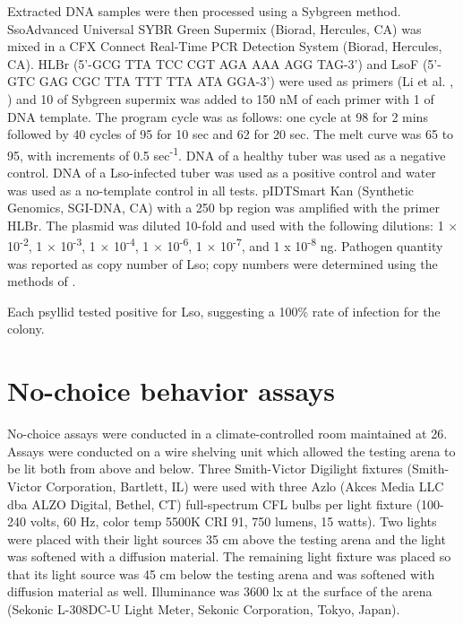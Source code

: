 \documentclass{UIdahoMastersThesis}
\begin{document}
Extracted DNA samples were then processed using a Sybgreen method. SsoAdvanced\textsuperscript{\texttrademark} Universal SYBR\textsuperscript{\textregistered} Green Supermix (Biorad, Hercules, CA) was mixed in a CFX Connect Real-Time PCR Detection System (Biorad, Hercules, CA). HLBr (5’-GCG TTA TCC CGT AGA AAA AGG TAG-3’) and LsoF (5’-GTC GAG CGC TTA TTT TTA ATA GGA-3’) were used as primers (Li et al. \citeyear{Li2006}, \citeyear{Li2009}) and 10 {\micro\liter} of Sybgreen supermix was added to 150 nM of each primer with 1 {\micro\liter} of DNA template. The program cycle was as follows: one cycle at 98{\degreeCelsius} for 2 mins followed by 40 cycles of 95{\degreeCelsius} for 10 sec and 62{\degreeCelsius} for 20 sec. The melt curve was 65{\degreeCelsius} to 95{\degreeCelsius}, with increments of 0.5{\degreeCelsius} sec\textsuperscript{-1}. DNA of a healthy tuber was used as a negative control. DNA of a Lso-infected tuber was used as a positive control and water was used as a no-template control in all tests. pIDTSmart Kan (Synthetic Genomics, SGI-DNA, CA) with a 250 bp region was amplified with the primer HLBr. The plasmid was diluted 10-fold and used with the following dilutions: 1 $\times$ 10\textsuperscript{-2}, 1 $\times$ 10\textsuperscript{-3}, 1 $\times$ 10\textsuperscript{-4}, 1 $\times$ 10\textsuperscript{-6}, 1 $\times$ 10\textsuperscript{-7}, and 1 x 10\textsuperscript{-8} ng. Pathogen quantity was reported as copy number of Lso; copy numbers were determined using the methods of \autocite{Levy2011}.

Each psyllid tested positive for Lso, suggesting a 100\% rate of infection for the colony. 

\newpage
\section{No-choice behavior assays}
\label{sec:no-choice}
No-choice assays were conducted in a climate-controlled room maintained at 26{\degreeCelsius}. Assays were conducted on a wire shelving unit which allowed the testing arena to be lit both from above and below. Three Smith-Victor Digilight fixtures (Smith-Victor Corporation, Bartlett, IL) were used with three Azlo (Akces Media LLC dba ALZO Digital, Bethel, CT) full-spectrum CFL bulbs per light fixture (100-240 volts, 60 Hz, color temp 5500K CRI 91, 750 lumens, 15 watts). Two lights were placed with their light sources 35 cm above the testing arena and the light was softened with a diffusion material. The remaining light fixture was placed so that its light source was 45 cm below the testing arena and was softened with diffusion material as well. Illuminance was 3600 lx at the surface of the arena (Sekonic L-308DC-U Light Meter, Sekonic Corporation, Tokyo, Japan). 
\end{document}
